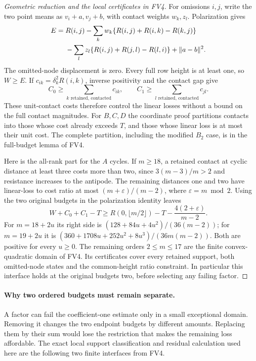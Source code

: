 \documentclass[11pt]{article}
\theoremstyle{remark}\newtheorem{remark}[theorem]{Remark}
\numberwithin{equation}{section}
\begin{document}
\begin{proof}[Geometric reduction and the local certificates in FV4]
For omissions $i,j$, write the two point means as $v_i+a,v_j+b$,
with contact weights $w_k,z_l$. Polarization gives
\begin{align}\label{fv:eq:full-budget-polarization}
E={}&R(i,j)-\sum_k w_k\{R(i,j)+R(i,k)-R(k,j)\}\notag\\
&-\sum_l z_l\{R(i,j)+R(j,l)-R(l,i)\}+\|a-b\|^2.
\end{align}
The omitted-node displacement is zero. Every full row height is
at least one, so $W\ge E$. If
$c_{ik}=\delta_k^2R(i,k)$, inverse positivity and the contact gap give
\[
 C_0\ge\sum_{k\text{ retained, contacted}}c_{ik},\qquad
 C_1\ge\sum_{l\text{ retained, contacted}}c_{jl}.
\]
These unit-contact costs therefore control the linear losses
without a bound on the full contact magnitudes. For $B,C,D$ the
coordinate proof partitions contacts into those whose cost already
exceeds $T$, and those whose linear loss is at most their unit cost.
The complete partition, including the modified $B_2$ case, is in
the full-budget lemma of FV4.

Here is the all-rank part for the $A$ cycles. If $m\ge18$, a
retained contact at cyclic distance at least three costs more than
two, since $3(m-3)/m>2$ and resistance increases to the antipode.
The remaining distances one and two have linear-loss to cost ratio
at most $(m+\varepsilon)/(m-2)$, where $\varepsilon=m\bmod2$.
Using the two original budgets in the polarization identity leaves
\[
 W+C_0+C_1-T\ge
 R(0,\lfloor m/2\rfloor)-T-\frac{4(2+\varepsilon)}{m-2}.
\]
For $m=18+2u$ its right side is
$(128+84u+4u^2)/(36(m-2))$; for $m=19+2u$ it is
$(360+1708u+252u^2+8u^3)/(36m(m-2))$. Both are positive
for every $u\ge0$. The remaining orders $2\le m\le17$
are the finite convex-quadratic domain of FV4. Its certificates
cover every retained support, both omitted-node states and the
common-height ratio constraint. In particular this interface holds
at the original budgets two, before selecting any failing factor.
\end{proof}

\paragraph{Why two ordered budgets must remain separate.}
A factor can fail the coefficient-one estimate only in a small
exceptional domain. Removing it changes the two endpoint budgets
by different amounts. Replacing them by their sum would lose the
restriction that makes the remaining loss affordable. The exact
local support classification and residual calculation used here
are the following two finite interfaces from FV4.
\end{document}
